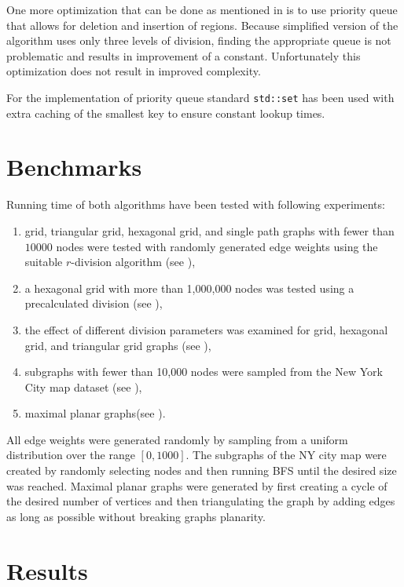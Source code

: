 One more optimization that can be done as mentioned in \cite{henzinger} is to use priority queue that allows for deletion and insertion of regions. Because simplified version of the algorithm uses only three levels of division, finding the appropriate queue is not problematic and results in improvement of a constant. Unfortunately this optimization does not result in improved complexity.

For the implementation of priority queue standard \texttt{std::set} has been used with extra caching of the smallest key to ensure constant lookup times.

\section{Benchmarks}
Running time of both algorithms have been tested with following experiments:
\begin{enumerate}
\item grid, triangular grid, hexagonal grid, and single path graphs with fewer than $10 000$ nodes were tested with randomly generated edge weights using the suitable $r$-division algorithm (see ),
\item a hexagonal grid with more than 1,000,000 nodes was tested using a precalculated division (see ),
\item the effect of different division parameters was examined for grid, hexagonal grid, and triangular grid graphs (see ),
\item subgraphs with fewer than 10,000 nodes were sampled from the New York City map dataset \cite{ny} (see ),
\item maximal planar graphs(see ).
\end{enumerate}

All edge weights were generated randomly by sampling from a uniform distribution over the range $[0, 1000]$. The subgraphs of the NY city map were created by randomly selecting nodes and then running BFS until the desired size was reached. Maximal planar graphs were generated by first creating a cycle of the desired number of vertices and then triangulating the graph by adding edges as long as possible without breaking graphs planarity.

\section{Results}

